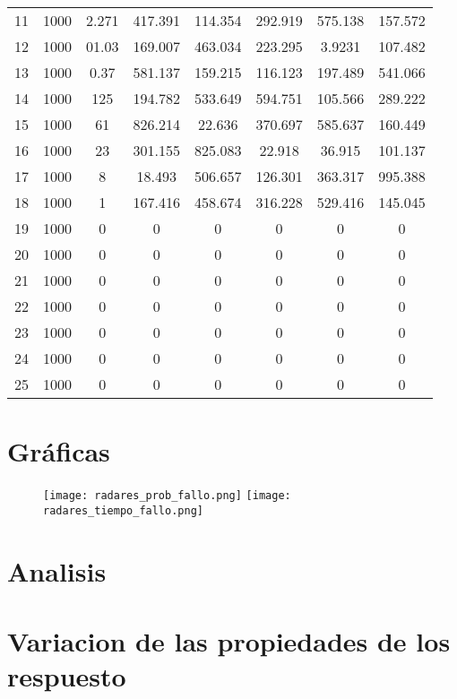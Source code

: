 \begin{table}[h]
{\begin{tabular}{|c|c|c|c|c|c|c|c|}
11 & 1000 & 2.271 & 417.391 & 114.354 & 292.919 & 575.138 & 157.572 \\
12 & 1000 & 01.03 & 169.007 & 463.034 & 223.295 & 3.9231 & 107.482 \\
13 & 1000 & 0.37 & 581.137 & 159.215 & 116.123 & 197.489 & 541.066 \\
14 & 1000 & 125 & 194.782 & 533.649 & 594.751 & 105.566 & 289.222 \\
15 & 1000 & 61 & 826.214 & 22.636 & 370.697 & 585.637 & 160.449 \\
16 & 1000 & 23 & 301.155 & 825.083 & 22.918 & 36.915 & 101.137 \\
17 & 1000 & 8 & 18.493 & 506.657 & 126.301 & 363.317 & 995.388 \\
18 & 1000 & 1 & 167.416 & 458.674 & 316.228 & 529.416 & 145.045 \\
19 & 1000 & 0 & 0 & 0 & 0 & 0 & 0 \\
20 & 1000 & 0 & 0 & 0 & 0 & 0 & 0 \\
21 & 1000 & 0 & 0 & 0 & 0 & 0 & 0 \\
22 & 1000 & 0 & 0 & 0 & 0 & 0 & 0 \\
23 & 1000 & 0 & 0 & 0 & 0 & 0 & 0 \\
24 & 1000 & 0 & 0 & 0 & 0 & 0 & 0 \\
25 & 1000 & 0 & 0 & 0 & 0 & 0 & 0 \\ \hline
\end{tabular}%
}
\end{table}

\section{Gráficas}

\begin{figure}[h]
\texttt{[image: radares\_prob\_fallo.png]}
\texttt{[image: radares\_tiempo\_fallo.png]}
\centering
\end{figure}

\section{Analisis}

\section{Variacion de las  propiedades de los respuesto}

